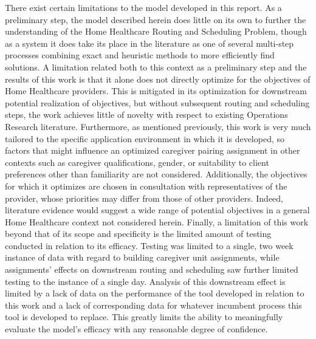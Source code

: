 \documentclass[11pt,twoside]{article}
\numberwithin{Theorem}{section}
\numberwithin{Definition}{section}
\numberwithin{Lemma}{section}
\numberwithin{Algorithm}{section}
\numberwithin{equation}{section}
\begin{document}
There exist certain limitations to the model developed in this report. As a preliminary step, the model described herein does little on its own to further the understanding of the Home Healthcare Routing and Scheduling Problem, though as a system it does take its place in the literature as one of several multi-step processes combining exact and heuristic methods to more efficiently find solutions. A limitation related both to this context as a preliminary step and the results of this work is that it alone does not directly optimize for the objectives of Home Healthcare providers. This is mitigated in its optimization for downstream potential realization of objectives, but without subsequent routing and scheduling steps, the work achieves little of novelty with respect to existing Operations Research literature. Furthermore, as mentioned previously, this work is very much tailored to the specific application environment in which it is developed, so factors that might influence an optimized caregiver pairing assignment in other contexts such as caregiver qualifications, gender, or suitability to client preferences other than familiarity are not considered. Additionally, the objectives for which it optimizes are chosen in consultation with representatives of the provider, whose priorities may differ from those of other providers. Indeed, literature evidence would suggest a wide range of potential objectives in a general Home Healthcare context not considered herein. Finally, a limitation of this work beyond that of its scope and specificity is the limited amount of testing conducted in relation to its efficacy. Testing was limited to a single, two week instance of data with regard to building caregiver unit assignments, while assignments' effects on downstream routing and scheduling saw further limited testing to the instance of a single day. Analysis of this downstream effect is limited by a lack of data on the performance of the tool developed in relation to this work and a lack of corresponding data for whatever incumbent process this tool is developed to replace. This greatly limits the ability to meaningfully evaluate the model's efficacy with any reasonable degree of confidence.
\end{document}
